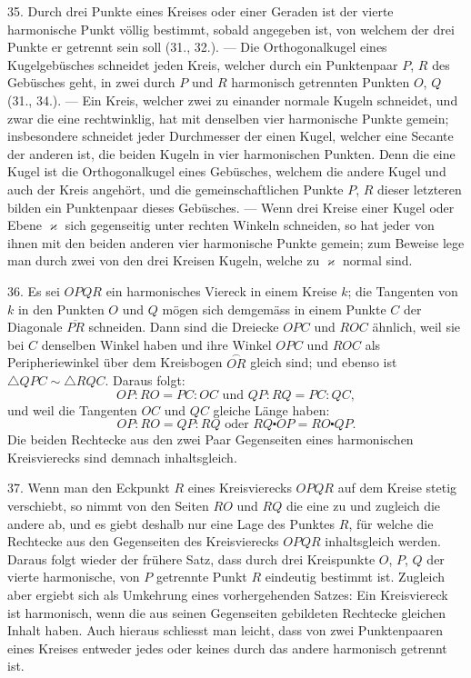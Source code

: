 35. Durch drei Punkte eines Kreises oder einer Geraden
ist der vierte harmonische Punkt v\"ollig bestimmt, sobald
angegeben ist, von welchem der drei Punkte er getrennt
sein soll (31., 32.). --- Die Orthogonalkugel eines Kugelgeb\"usches
schneidet jeden Kreis, welcher durch ein Punktenpaar
$P$, $R$ des Geb\"usches geht, in zwei durch $P$ und $R$ harmonisch
getrennten Punkten $O$, $Q$ (31., 34.). --- Ein Kreis,
welcher zwei zu einander normale Kugeln schneidet, und
zwar die eine rechtwinklig, hat mit denselben vier harmonische
Punkte gemein; insbesondere schneidet jeder Durchmesser
der einen Kugel, welcher eine Secante der anderen
ist, die beiden Kugeln in vier harmonischen Punkten. Denn
die eine Kugel ist die Orthogonalkugel eines Geb\"usches,
welchem die andere Kugel und auch der Kreis angeh\"ort,
und die gemeinschaftlichen Punkte $P$, $R$ dieser letzteren bilden
ein Punktenpaar dieses Geb\"usches. --- Wenn drei Kreise
einer Kugel oder Ebene $\varkappa$ sich gegenseitig unter rechten
Winkeln schneiden, so hat jeder von ihnen mit den beiden
anderen vier harmonische Punkte gemein; zum Beweise lege
man durch zwei von den drei Kreisen Kugeln, welche zu $\varkappa$
normal sind.

36. Es sei $OPQR$ ein harmonisches Viereck in einem
Kreise $k$; die Tangenten von $k$ in den Punkten $O$ und $Q$
m\"ogen sich demgem\"ass in einem Punkte $C$ der Diagonale
$\overline{PR}$ schneiden. Dann sind die Dreiecke $OPC$ und $ROC$ \"ahnlich,
weil sie bei $C$ denselben Winkel haben und ihre Winkel
$OPC$ und $ROC$ als Peripheriewinkel \"uber dem Kreisbogen
$\stackrel{\frown}{OR}$ gleich sind; und ebenso ist $\triangle QPC \sim \triangle RQC$. Daraus
folgt:
\[
OP : RO = PC : OC \text{ und } QP : RQ = PC : QC,
\]
und weil die Tangenten $OC$ und $QC$ gleiche L\"ange haben:
\[
OP : RO = QP : RQ \text{ oder } RQ \centerdot OP = RO \centerdot QP.
\]
Die beiden Rechtecke aus den zwei Paar Gegenseiten eines
harmonischen Kreisvierecks sind demnach inhaltsgleich.

37. Wenn man den Eckpunkt $R$ eines Kreisvierecks
$OPQR$ auf dem Kreise stetig verschiebt, so nimmt von den
Seiten $RO$ und $RQ$ die eine zu und zugleich die andere ab,
und es giebt deshalb nur eine Lage des Punktes $R$, f\"ur
welche die Rechtecke aus den Gegenseiten des Kreisvierecks
$OPQR$ inhaltsgleich werden. Daraus folgt wieder der fr\"uhere
Satz, dass durch drei Kreispunkte $O$, $P$, $Q$ der vierte
harmonische, von $P$ getrennte Punkt $R$ eindeutig bestimmt
ist. Zugleich aber ergiebt sich als Umkehrung eines vorhergehenden
Satzes: Ein Kreisviereck ist harmonisch, wenn die
aus seinen Gegenseiten gebildeten Rechtecke gleichen Inhalt
haben. Auch hieraus schliesst man leicht, dass von zwei
Punktenpaaren eines Kreises entweder jedes oder keines durch
das andere harmonisch getrennt ist.

